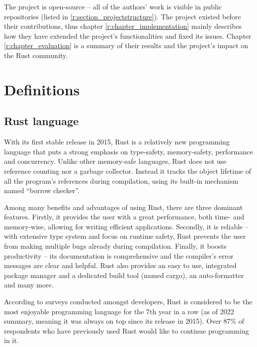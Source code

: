 \documentclass[licencjacka,en]{pracamgr}
\begin{document}
The project is open-source -- all of the authors' work is visible in public repositories (listed in
\ref{r:section_projectstructure}). The project existed before their contributions, thus chapter
\ref{r:chapter_implementation} mainly describes how they have extended the project's
functionalities and fixed its issues. Chapter \ref{r:chapter_evaluation} is a summary of their
results and the project's impact on the Rust community.


\chapter{Definitions}\label{r:chapter_definitions}

\section{Rust language}

With its first stable release in 2015, Rust is a relatively new programming language that
puts a strong emphasis on type-safety, memory-safety, performance and concurrency. Unlike
other memory-safe languages, Rust does not use reference counting nor a garbage collector.
Instead it tracks the object lifetime of all the program's references during compilation,
using its built-in mechanism named ``borrow checker''.

Among many benefits and advantages of using Rust, there are three dominant features. Firstly,
it provides the user with a great performance, both time- and memory-wise, allowing for
writing efficient applications. Secondly, it is reliable -- with extensive type system and
focus on runtime safety, Rust prevents the user from making multiple bugs
already during compilation. Finally, it boosts productivity -- its documentation is
comprehensive and the compiler's error messages are clear and helpful. Rust also provides
an easy to use, integrated package manager and a dedicated build tool (named cargo),
an auto-formatter and many more.

According to surveys \cite{survey} conducted amongst developers, Rust is considered to be the most
enjoyable programming language for the 7th year in a row (as of 2022 summary, meaning it was always
on top since its release in 2015). Over 87\% of respondents who have previously used Rust would
like to continue programming in it.
\end{document}
